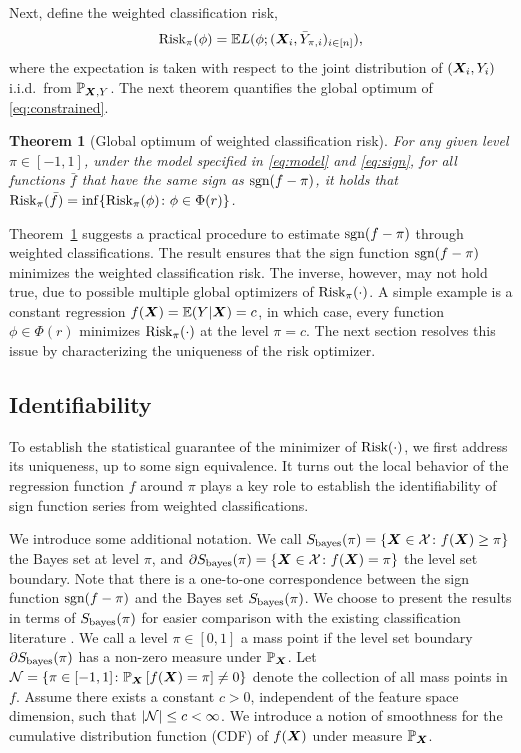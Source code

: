 \documentclass[aos]{imsart}
\newtheorem{theorem}{Theorem}%
\theoremstyle{definition}
\def\sign{\textup{sgn}}
\def\risk{\textup{Risk}}
\def\bayesS{S_{\textup{bayes}}}
\begin{document}
Next, define the weighted classification risk, 
\begin{equation}\label{eq:constrained}
\risk_\pi(\phi)=\mathbb{E}L(\phi; (\mX_i,\bar Y_{\pi,i})_{i\in[n]}),
\end{equation}
where the expectation is taken with respect to the joint distribution of $(\bm X_i,Y_i)$ i.i.d.\ from $\mathbb{P}_{\bm X,Y}$. The next theorem quantifies the global optimum of \eqref{eq:constrained}. 

\begin{theorem}[Global optimum of weighted classification risk]\label{thm:oracle} For any given level $\pi\in[-1,1]$, under the model specified in \eqref{eq:model} and \eqref{eq:sign}, for all functions $\bar f$ that have the same sign as $\sign(f-\pi)$, it holds that $\risk_\pi(\bar f) = \inf\{\risk_\pi(\phi)\colon \phi\in \Phi(r)\}$. 
\end{theorem}

\noindent
Theorem~\ref{thm:oracle} suggests a practical procedure to estimate $\sign(f-\pi)$ through weighted classifications. The result ensures that the sign function $\sign(f-\pi)$ minimizes the weighted classification risk. The inverse, however, may not hold true, due to possible multiple global optimizers of $\risk_\pi(\cdot)$. A simple example is a constant regression $f(\bm X)=\mathbb{E}(Y|\bm X) = c$, in which case, every function $\phi\in \Phi(r)$ minimizes $\risk_\pi(\cdot)$ at the level $\pi=c$. The next section resolves this issue by characterizing the uniqueness of the risk optimizer. 



\subsection{Identifiability}\label{sec:identifiability}

To establish the statistical guarantee of the minimizer of $\risk(\cdot)$, we first address its uniqueness, up to some sign equivalence. It turns out the local behavior of the regression function $f$ around $\pi$ plays a key role to establish the identifiability of sign function series from weighted classifications.

We introduce some additional notation. We call $\bayesS(\pi)=\{\mX\in\tX\colon f(\mX)\geq \pi\}$ the Bayes set at level $\pi$, and $\partial \bayesS(\pi)=\{\mX\in \tX\colon f(\mX)=\pi\}$ the level set boundary. Note that there is a one-to-one correspondence between the sign function $\sign(f-\pi)$ and the Bayes set $\bayesS(\pi)$. We choose to present the results in terms of $\bayesS(\pi)$ for easier comparison with the existing classification literature \citep{tsybakov2004optimal,singh2009adaptive}. We call a level $\pi\in[0,1]$ a mass point if the level set boundary $\partial \bayesS(\pi)$ has a non-zero measure under $\mathbb{P}_{\bm X}$. Let $\mathcal{N}=\{\pi\in[-1,1] \colon \mathbb{P}_{\bm X}\left[f(\bm X)=\pi\right]\neq 0\}$ denote the collection of all mass points in $f$. Assume there exists a constant $c>0$, independent of the feature space dimension, such that $|\mathcal{N}|\leq c<\infty$. We introduce a notion of smoothness for the cumulative distribution function (CDF) of $f(\bm X)$ under measure $ \mathbb{P}_{\bm X}$. 
\end{document}
